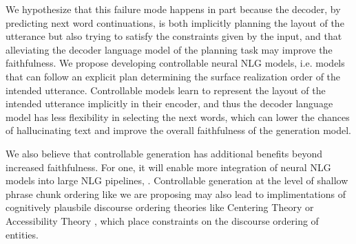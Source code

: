 We hypothesize that this failure mode happens in part because the decoder,
by predicting next word continuations, is both
implicitly planning the layout of the utterance but also trying to satisfy the
constraints given by the input, and that alleviating the decoder language
model of the planning task may improve the faithfulness.  We propose
developing controllable neural NLG models, i.e. models that can
follow an explicit plan determining  the surface realization order of the
intended utterance.  Controllable models learn to represent the layout
of the intended utterance implicitly in their encoder, and thus the decoder
language model has less flexibility in selecting the next words, which can
lower the chances of hallucinating text and improve the overall faithfulness
of the generation model.

We also believe that controllable generation has additional benefits beyond
increased faithfulness. For one, it will enable more integration of neural NLG
models into large NLG pipelines, \citep{castroferreira2019}.
Controllable generation at the level of shallow phrase chunk ordering like
we are proposing may also lead to 
implimentations of cognitively
plausbile discourse ordering theories like Centering Theory \citep{grosz1995} or Accessibility Theory \citep{ariel2001}, which place constraints on the discourse ordering of entities.




%
%
%
%
%
%  
%
%
%
%
%
%
%
      
